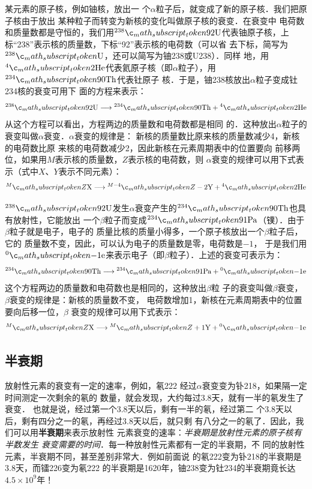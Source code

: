 某元素的原子核，例如铀核，放出一
个$\alpha$粒子后，就变成了新的原子核．我们把原子核由于放出
某种粒子而转变为新核的变化叫做原子核的衰变．在衰变中
电荷数和质量数都是守恒的，我们用$\atom{U}{238}{92}$代表铀原子核，上
标“238”表示核的质量数，下标“92”表示核的电荷数（可以省
去下标，简写为$\atom{U}{238}{}$，还可以简写为铀238或U238）．同样
地，用$\atom{He}{4}{2}$代表氦原子核（即$\alpha$粒子），用$\atom{Th}{234}{90}$代表钍原子
核．于是，铀238核放出$\alpha$粒子变成钍234核的衰变可用下
面的方程来表示：
\[\atom{U}{238}{92}\longrightarrow \atom{Th}{234}{90}+\atom{He}{4}{2}\]
从这个方程可以看出，方程两边的质量数和电荷数都是相同
的．这种放出$\alpha$粒子的衰变叫做$\alpha$衰变．$\alpha$衰变的规律是：
新核的质量数比原来核的质量数减少4，新核的电荷数比原
来核的电荷数减少2，因此新核在元素周期表中的位置要向
前移两位，如果用$M$表示核的质量数，$Z$表示核的电荷数，则
$\alpha$衰变的规律可以用下式表示（式中$X$、$Y$表示不同元素）：
\[\atom{X}{M}{Z}\longrightarrow \atom{Y}{M-4}{Z-2}+\atom{He}{4}{2}   \]

$\atom{U}{238}{92}$发生$\alpha$衰变产生的$\atom{Th}{234}{90}$也具有放射性，它能放出
一个$\beta$粒子而变成$\atom{Pa}{234}{91}$（镤）．由于$\beta$粒子就是电子，电子的
质量比核的质量小得多，一个原子核放出一个$\beta$粒子后，它的
质量数不变，因此，可以认为电子的质量数是零，电荷数是$-1$，
于是我们用$\atom{e}{0}{-1}$来表示电子（即$\beta$粒子）．上述的衰变可表示为：
\[\atom{Th}{234}{90}\longrightarrow \atom{Pa}{234}{91}+ \atom{e}{0}{-1}\]
这个方程两边的质量数和电荷数也是相同的，这种放出$\beta$粒
子的衰变叫做$\beta$衰变，$\beta$衰变的规律是：新核的质量数不变，
电荷数增加1，新核在元素周期表中的位置要向后移一位，$\beta$
衰变的规律可以用下式表示：
\[\atom{X}{M}{Z}\longrightarrow \atom{Y}{M}{Z+1}+ \atom{e}{0}{-1}\]



\subsection{半衰期}
放射性元素的衰变有一定的速率，例如，氡222
经过$\alpha$衰变变为钋218，如果隔一定时间测定一次剩余的氡的
数量，就会发现，大约每过3.8天，就有一半的氡发生了衰变．
也就是说，经过第一个3.8天以后，剩有一半的氡，经过第二
个3.8天以后，剩有四分之一的氡，再经过3.8天以后，就只剩
有八分之一的氡了．因此，我们可以用\textbf{半衰期}来表示放射性
元素衰变的速率：\textit{半衰期是放射性元素的原子核有半数发生
衰变需要的时间}．每一种放射性元素都有一定的半衰期，不
同的放射性元素，半衰期不同，甚至差别非常大．例如前面说
的氡222变为钋218的半衰期是3.8天，而镭226变为氡222
的半衰期是1620年，铀238变为钍234的半衰期竟长达$4.5
\times10^9$年！


